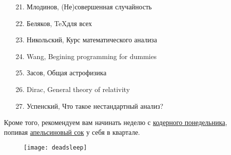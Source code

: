 \begin{itemize}
        \item[21.] Млодинов, (Не)совершенная случайность
        \item[22.] Беляков, \TeX для всех
        \item[23.] Никольский, Курс математического анализа
        \item[24.] Wang, Begining programming for dummies
        \item[25.] Засов, Общая астрофизика
        \item[26.] Dirac, General theory of relativity
        \item[27.] Успенский, Что такое нестандартный анализ?
\end{itemize}

Кроме того, рекомендуем вам начинать неделю с 
\href{https://freecx.github.io/}{кодерного понедельника},
попивая \href{https://citrux.github.io/blog/}{апельсиновый сок} у себя в квартале.

\begin{figure}[ht!]
    \centering
    \texttt{[image: deadsleep]}
\end{figure}
